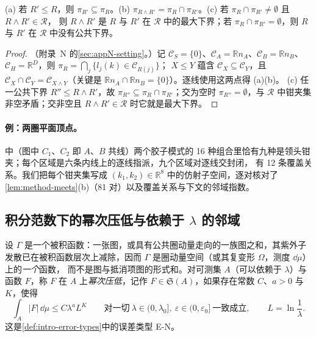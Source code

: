 \begin{lemma}[逐线交与钳夹集的交]\label{lem:method-meets}
(a) 若 $R'\le R$，则 $\pi_{R'}\subseteq\pi_R$。(b) $\pi_{R\wedge R'}=\pi_R\cap\pi_{R'}$。(c) 若 $\pi_R\cap\pi_{R'}\neq\emptyset$ 且 $R\wedge R'\in\mathcal R$，
则 $R\wedge R'$ 是 $R$ 与 $R'$ 在 $\mathcal R$ 中的最大下界；若 $\pi_R\cap\pi_{R'}=\emptyset$，则 $R$ 与 $R'$ 在 $\mathcal R$ 中没有公共下界。
\end{lemma}

\begin{proof}
（附录~N 的\cref{sec:appN-setting}。）记 $\mathcal C_S=\{0\}$、$\mathcal C_A=\mathbb Rn_A$、$\mathcal C_B=\mathbb Rn_B$、$\mathcal C_H=\mathbb R^D$，则 $\pi_R=\bigcap_j\{l_j(k)\in\mathcal C_{R(j)}\}$；
$X\le Y$ 蕴含 $\mathcal C_X\subseteq\mathcal C_Y$，且 $\mathcal C_X\cap\mathcal C_Y=\mathcal C_{X\wedge Y}$（关键是 $\mathbb Rn_A\cap\mathbb Rn_B=\{0\}$）。逐线使用这两点得 (a)(b)。
(c) 任一公共下界 $R''\le R\wedge R'$，故 $\pi_{R''}\subseteq\pi_R\cap\pi_{R'}$；交为空时 $\pi_{R''}=\emptyset$，与 $\mathcal R$ 中钳夹集非空矛盾；交非空且 $R\wedge R'\in\mathcal R$ 时它就是最大下界。
\end{proof}

\paragraph{例：两圈平面顶点。}中（图中 $C_1$、$C_2$ 即 $A$、$B$ 共线）两个胶子模式的 16 种组合里恰有九种是领头钳夹；每个区域是六条内线上的逐线指派，九个区域对逐线交封闭，
有 12 条覆盖关系。我们把每个钳夹集写成 $(k_1,k_2)\in\mathbb R^8$ 中的仿射子空间，逐对核对了\cref{lem:method-meets}(b)（81 对）以及覆盖关系与下文的邻域指数。%



\subsection{积分范数下的幂次压低与依赖于 $\lambda$ 的邻域}

\begin{definition}[积分范数意义下的幂次压低]\label{def:method-power-suppressed}
设 $\Gamma$ 是一个被积函数：一张图，或具有公共圈动量走向的一族图之和，其紫外子发散已在被积函数层次上减除，因而 $\Gamma$ 是圈动量空间（或其复变形 $\Omega$，测度 $\dd\mu$）上的\emph{一个}函数，
而不是图与抵消项图的形式和。对可测集 $A$（可以依赖于 $\lambda$）与函数 $F$，称 $F$ 在 $A$ 上\emph{幂次压低}，记作 $F\in\mathfrak S(A)$，如果存在常数 $C$、$a>0$ 与 $K$，使得
\begin{equation}\label{eq:method-EN}
\int_A|F|\,\dd\mu\le C\lambda^aL^K\qquad\text{对一切}\ \lambda\in(0,\lambda_0],\ \varepsilon\in(0,\varepsilon_0]\ \text{一致成立},\qquad L=\ln\frac1\lambda .
\end{equation}
这是\cref{def:intro-error-types}中的误差类型 E-N。
\end{definition}

